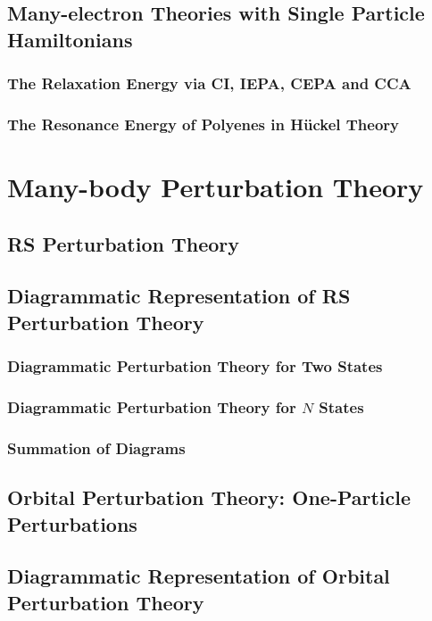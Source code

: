 \documentclass[a4paper]{article}
\numberwithin{equation}{section}
\begin{document}
\subsection{Many-electron Theories with Single Particle Hamiltonians}
\subsubsection{The Relaxation Energy via CI, IEPA, CEPA and CCA}

\subsubsection{The Resonance Energy of Polyenes in H\"uckel Theory}




\section{Many-body Perturbation Theory}
\subsection{RS Perturbation Theory}

\subsection{Diagrammatic Representation of RS Perturbation Theory}
\subsubsection{Diagrammatic Perturbation Theory for Two States}
\subsubsection{Diagrammatic Perturbation Theory for $ N $ States}
\subsubsection{Summation of Diagrams}

\subsection{Orbital Perturbation Theory: One-Particle Perturbations}

\subsection{Diagrammatic Representation of Orbital Perturbation Theory}
\end{document}
